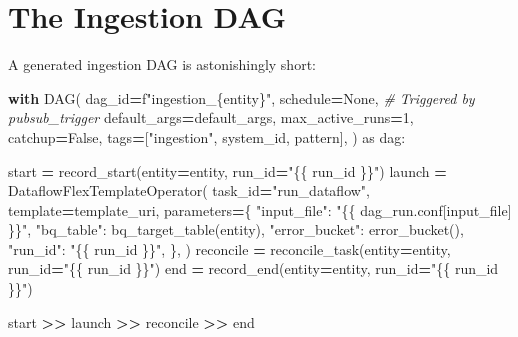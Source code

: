 \documentclass[
  11pt,
  british,
  oneside]{book}
\newenvironment{Shaded}{\begin{snugshade}}{\end{snugshade}}
\newcommand{\CommentTok}[1]{\textcolor[rgb]{0.56,0.35,0.01}{\textit{#1}}}
\newcommand{\ControlFlowTok}[1]{\textcolor[rgb]{0.13,0.29,0.53}{\textbf{#1}}}
\newcommand{\DecValTok}[1]{\textcolor[rgb]{0.00,0.00,0.81}{#1}}
\newcommand{\ImportTok}[1]{#1}
\newcommand{\NormalTok}[1]{#1}
\newcommand{\OperatorTok}[1]{\textcolor[rgb]{0.81,0.36,0.00}{\textbf{#1}}}
\newcommand{\SpecialCharTok}[1]{\textcolor[rgb]{0.00,0.00,0.00}{#1}}
\newcommand{\SpecialStringTok}[1]{\textcolor[rgb]{0.31,0.60,0.02}{#1}}
\newcommand{\StringTok}[1]{\textcolor[rgb]{0.31,0.60,0.02}{#1}}
\newcommand{\VariableTok}[1]{\textcolor[rgb]{0.00,0.00,0.00}{#1}}
\begin{document}
\hypertarget{the-ingestion-dag}{%
\section{The Ingestion DAG}\label{the-ingestion-dag}}

A generated ingestion DAG is astonishingly short:

\begin{Shaded}
\begin{Highlighting}[]
\ControlFlowTok{with}\NormalTok{ DAG(}
\NormalTok{    dag\_id}\OperatorTok{=}\SpecialStringTok{f"ingestion\_}\SpecialCharTok{\{}\NormalTok{entity}\SpecialCharTok{\}}\SpecialStringTok{"}\NormalTok{,}
\NormalTok{    schedule}\OperatorTok{=}\VariableTok{None}\NormalTok{,  }\CommentTok{\# Triggered by pubsub\_trigger}
\NormalTok{    default\_args}\OperatorTok{=}\NormalTok{default\_args,}
\NormalTok{    max\_active\_runs}\OperatorTok{=}\DecValTok{1}\NormalTok{,}
\NormalTok{    catchup}\OperatorTok{=}\VariableTok{False}\NormalTok{,}
\NormalTok{    tags}\OperatorTok{=}\NormalTok{[}\StringTok{"ingestion"}\NormalTok{, system\_id, pattern],}
\NormalTok{) }\ImportTok{as}\NormalTok{ dag:}

\NormalTok{    start }\OperatorTok{=}\NormalTok{ record\_start(entity}\OperatorTok{=}\NormalTok{entity, run\_id}\OperatorTok{=}\StringTok{"}\SpecialCharTok{\{\{}\StringTok{ run\_id }\SpecialCharTok{\}\}}\StringTok{"}\NormalTok{)}
\NormalTok{    launch }\OperatorTok{=}\NormalTok{ DataflowFlexTemplateOperator(}
\NormalTok{        task\_id}\OperatorTok{=}\StringTok{"run\_dataflow"}\NormalTok{,}
\NormalTok{        template}\OperatorTok{=}\NormalTok{template\_uri,}
\NormalTok{        parameters}\OperatorTok{=}\NormalTok{\{}
            \StringTok{"input\_file"}\NormalTok{: }\StringTok{"}\SpecialCharTok{\{\{}\StringTok{ dag\_run.conf[\textquotesingle{}input\_file\textquotesingle{}] }\SpecialCharTok{\}\}}\StringTok{"}\NormalTok{,}
            \StringTok{"bq\_table"}\NormalTok{: bq\_target\_table(entity),}
            \StringTok{"error\_bucket"}\NormalTok{: error\_bucket(),}
            \StringTok{"run\_id"}\NormalTok{: }\StringTok{"}\SpecialCharTok{\{\{}\StringTok{ run\_id }\SpecialCharTok{\}\}}\StringTok{"}\NormalTok{,}
\NormalTok{        \},}
\NormalTok{    )}
\NormalTok{    reconcile }\OperatorTok{=}\NormalTok{ reconcile\_task(entity}\OperatorTok{=}\NormalTok{entity, run\_id}\OperatorTok{=}\StringTok{"}\SpecialCharTok{\{\{}\StringTok{ run\_id }\SpecialCharTok{\}\}}\StringTok{"}\NormalTok{)}
\NormalTok{    end }\OperatorTok{=}\NormalTok{ record\_end(entity}\OperatorTok{=}\NormalTok{entity, run\_id}\OperatorTok{=}\StringTok{"}\SpecialCharTok{\{\{}\StringTok{ run\_id }\SpecialCharTok{\}\}}\StringTok{"}\NormalTok{)}

\NormalTok{    start }\OperatorTok{\textgreater{}\textgreater{}}\NormalTok{ launch }\OperatorTok{\textgreater{}\textgreater{}}\NormalTok{ reconcile }\OperatorTok{\textgreater{}\textgreater{}}\NormalTok{ end}
\end{Highlighting}
\end{Shaded}
\end{document}
